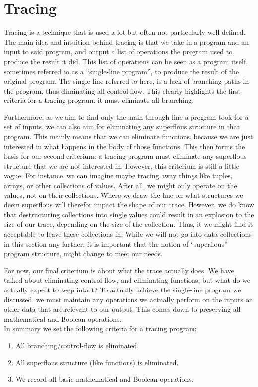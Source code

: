 \section{Tracing}
    Tracing is a technique that is used a lot but often not particularly well-defined.
    The main idea and intuition behind tracing is that we take in a program and an input to said program, and output a list of operations the program used to produce the result it did.
    This list of operations can be seen as a program itself, sometimes referred to as a ``single-line program''\cn, to produce the result of the original program.
    The single-line referred to here, is a lack of branching paths in the program, thus eliminating all control-flow.
    This clearly highlights the first criteria for a tracing program: it must eliminate all branching.
    
    Furthermore, as we aim to find only the main through line a program took for a set of inputs, we can also aim for eliminating any superflous structure in that program.
    This mainly means that we can eliminate functions, because we are just interested in what happens in the body of those functions.
    This then forms the basis for our second criterium: a tracing program must eliminate any superflous structure that we are not interested in.
    However, this criterium is still a little vague.
    For instance, we can imagine maybe tracing away things like tuples, arrays, or other collections of values.
    After all, we might only operate on the values, not on their collections.
    Where we draw the line on what structures we deem superflous will therefor impact the shape of our trace.
    However, we do know that destructuring collections into single values could result in an explosion to the size of our trace, depending on the size of the collection.
    Thus, it we might find it acceptable to leave these collections in.
    While we will not go into data collections in this section any further, it is important that the notion of ``superflous'' program structure, might change to meet our needs.

    For now, our final criterium is about what the trace actually does.
    We have talked about eliminating control-flow, and eliminating functions, but what do we actually expect to keep intact?
    To actually achieve the single-line program we discussed, we must maintain any operations we actually perform on the inputs or other data that are relevant to our output.
    This comes down to preserving all mathematical and Boolean operations.\\
    In summary we set the following criteria for a tracing program:
    \begin{enumerate}
        \item All branching/control-flow is eliminated.
        \item All superflous structure (like functions) is eliminated.
        \item We record all basic mathematical and Boolean operations.
    \end{enumerate}

